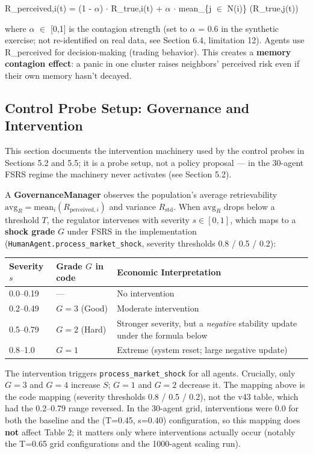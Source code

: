 \documentclass[11pt]{article}
\begin{document}
R\_perceived,i(t) = (1 - $\alpha$) $\cdot$ R\_true,i(t) + $\alpha$ $\cdot$ mean\_\{j $\in$ N(i)\} (R\_true,j(t))

where $\alpha$ $\in$ [0,1] is the contagion strength (set to $\alpha$ = 0.6 in the synthetic exercise; not re-identified on real data, see Section 6.4, limitation 12). Agents use R\_perceived for decision-making (trading behavior). This creates a \textbf{memory contagion effect}: a panic in one cluster raises neighbors' perceived risk even if their own memory hasn't decayed.

\subsection{Control Probe Setup: Governance and Intervention}
This section documents the intervention machinery used by the control probes in Sections 5.2 and 5.5; it is a probe setup, not a policy proposal --- in the 30-agent FSRS regime the machinery never activates (see Section 5.2).

A \textbf{GovernanceManager} observes the population's average retrievability $\text{avg}_R = \text{mean}_i(R_{\text{perceived},i})$ and variance $R_{\text{std}}$. When $\text{avg}_R$ drops below a threshold $T$, the regulator intervenes with severity $s \in [0,1]$, which maps to a \textbf{shock grade} $G$ under FSRS in the implementation (\texttt{HumanAgent.process\_market\_shock}, severity thresholds 0.8 / 0.5 / 0.2):

\begin{table}[htbp]
\centering
\begin{tabular}{lll}
\toprule
\textbf{Severity $s$} & \textbf{Grade $G$ in code} & \textbf{Economic Interpretation} \\
\midrule
0.0--0.19 & --- & No intervention \\
0.2--0.49 & $G=3$ (Good) & Moderate intervention \\
0.5--0.79 & $G=2$ (Hard) & Stronger severity, but a \textit{negative} stability update under the formula below \\
0.8--1.0 & $G=1$ & Extreme (system reset; large negative update) \\
\bottomrule
\end{tabular}
\end{table}

The intervention triggers \texttt{process\_market\_shock} for all agents. Crucially, only $G=3$ and $G=4$ increase $S$; $G=1$ and $G=2$ decrease it. The mapping above is the code mapping (severity thresholds 0.8 / 0.5 / 0.2), not the v43 table, which had the 0.2--0.79 range reversed. In the 30-agent grid, interventions were 0.0 for both the baseline and the (T=0.45, s=0.40) configuration, so this mapping does \textbf{not} affect Table 2; it matters only where interventions actually occur (notably the T=0.65 grid configurations and the 1000-agent scaling run).
\end{document}
